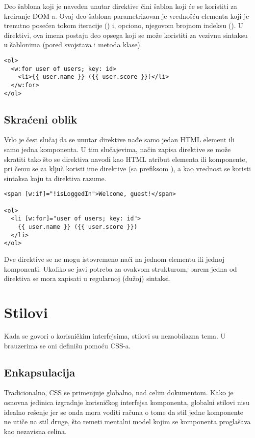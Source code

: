 Deo šablona koji je naveden unutar direktive čini šablon koji će se koristiti za kreiranje DOM-a.
Ovaj deo šablona parametrizovan je vrednošću elementa koji je trenutno posećen tokom iteracije () i, opciono, njegovom brojnom indeksu ().
U direktivi, ova imena postaju deo opsega koji se može koristiti za vezivnu sintaksu u šablonima (pored svojstava i metoda klase).

\begin{verbatim}
<ol>
  <w:for user of users; key: id>
    <li>{{ user.name }} ({{ user.score }})</li>
  </w:for>
</ol>
\end{verbatim}

\subsection{Skraćeni oblik}

Vrlo je čest slučaj da se unutar direktive nađe samo jedan HTML element ili samo jedna komponenta.
U tim slučajevima, način zapisa direktive se može skratiti tako što se direktiva navodi kao HTML atribut elementa ili komponente, pri čemu se za ključ koristi ime direktive (sa prefiksom ), a kao vrednost se koristi sintaksa koju ta direktiva razume.

\begin{verbatim}
<span [w:if]="!isLoggedIn">Welcome, guest!</span>

<ol>
  <li [w:for]="user of users; key: id">
    {{ user.name }} ({{ user.score }})
  </li>
</ol>
\end{verbatim}

Dve direktive se ne mogu istovremeno naći na jednom elementu ili jednoj komponenti.
Ukoliko se javi potreba za ovakvom strukturom, barem jedna od direktiva se mora zapisati u regularnoj (dužoj) sintaksi.

\section{Stilovi}
\label{sec:ch04:stilovi}

Kada se govori o korisničkim interfejsima, stilovi su nezaobilazna tema.
U brauzerima se oni definišu pomoću CSS-a.

\subsection{Enkapsulacija}

Tradicionalno, CSS se primenjuje globalno, nad celim dokumentom.
Kako je osnovna jedinica izgradnje korisničkog interfejsa komponenta, globalni stilovi nisu idealno rešenje jer se onda mora voditi računa o tome da stil jedne komponente ne utiče na stil druge, što remeti mentalni model kojim se komponenta proglašava kao nezavisna celina.

